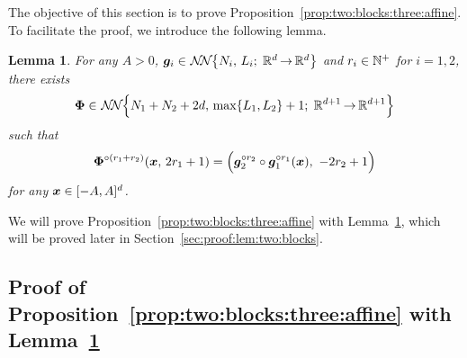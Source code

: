 \documentclass[nohyperref]{article}
\theoremstyle{plain}
\newtheorem{lemma}[theorem]{Lemma}
\theoremstyle{definition}
\theoremstyle{remark}
\begin{document}


The objective of this section is to prove Proposition~\ref{prop:two:blocks:three:affine}. To facilitate the proof, we introduce the following lemma.

\begin{lemma}
	\label{lem:two:blocks}
	For any $A>0$, $\bmg_i\in \nn[\big]{N_i}{L_i}{d}{d}$ and $r_i\in \N^+$ for $i=1,2$,
	there exists 
	\begin{equation*}
		\bmPhi\in \nn[\Big]{N_1+N_2+2d}{\max\{L_1,L_2\}+1}{d+1}{d+1}
	\end{equation*} 
	such that
	\begin{equation*}
		{\bm{\Phi}}^{\circ (r_1+r_2)}({\bm{x}},\,2r_1+1)=\Big({\bm{g}}_2^{\circ r_2}\circ {\bm{g}}_1^{\circ r_1}({\bm{x}}),\  -2r_2+1\Big)
	\end{equation*}
	for any ${\bm{x}} \in [-A,A]^d$. 
\end{lemma}
We will prove Proposition~\ref{prop:two:blocks:three:affine} with Lemma~\ref{lem:two:blocks}, which will be proved later in Section~\ref{sec:proof:lem:two:blocks}.

\subsection{Proof of Proposition~\ref{prop:two:blocks:three:affine} with Lemma~\ref{lem:two:blocks}}
\end{document}

